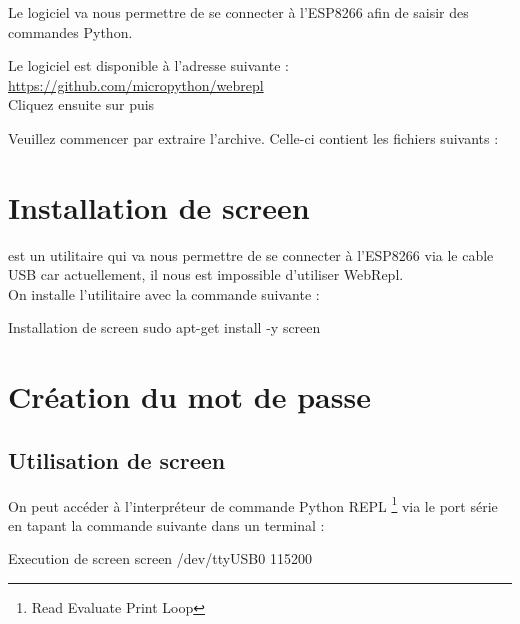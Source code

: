 Le logiciel  va nous permettre de se connecter à l'ESP8266 afin de saisir des commandes Python.

Le logiciel est disponible à l'adresse suivante : \\

\url{https://github.com/micropython/webrepl}\\

Cliquez ensuite sur  puis 


Veuillez commencer par extraire l'archive.
Celle-ci contient les fichiers suivants : 


\section{Installation de screen}

 est un utilitaire qui va nous permettre de se connecter à l'ESP8266 via le cable USB car actuellement, il nous est impossible d'utiliser WebRepl.\\
On installe l'utilitaire avec la commande suivante : 
\begin{Bash}{Installation de screen}
sudo apt-get install -y screen
\end{Bash}

\section{Création du mot de passe}

\subsection{Utilisation de screen}

On peut accéder à l’interpréteur de commande Python REPL \footnote{Read Evaluate Print Loop} via le port série en tapant la commande suivante dans un terminal :

\begin{Bash}{Execution de screen}
screen /dev/ttyUSB0 115200
\end{Bash}





